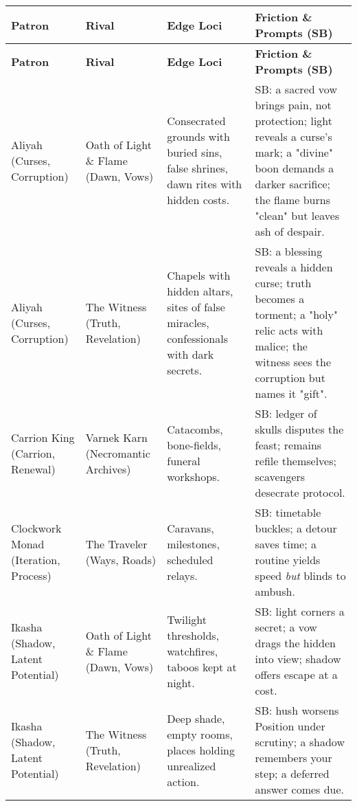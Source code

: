 \begin{longtable}{@{}p{3.3cm}p{3.3cm}p{4.6cm}p{7.2cm}@{}}
  \toprule
  \textbf{Patron} & \textbf{Rival} & \textbf{Edge Loci} & \textbf{Friction \& Prompts (SB)} \\
  \midrule
  \endfirsthead
  
  \toprule
  \textbf{Patron} & \textbf{Rival} & \textbf{Edge Loci} & \textbf{Friction \& Prompts (SB)} \\
  \midrule
  \endhead
  
  \bottomrule
  \endfoot


Aliyah (Curses, Corruption) & Oath of Light \& Flame (Dawn, Vows) &
Consecrated grounds with buried sins, false shrines, dawn rites with hidden costs. &
SB: a sacred vow brings pain, not protection; light reveals a curse's mark; a "divine" boon demands a darker sacrifice; the flame burns "clean" but leaves ash of despair. \\

Aliyah (Curses, Corruption) & The Witness (Truth, Revelation) &
Chapels with hidden altars, sites of false miracles, confessionals with dark secrets. &
SB: a blessing reveals a hidden curse; truth becomes a torment; a "holy" relic acts with malice; the witness sees the corruption but names it "gift". \\

Carrion King (Carrion, Renewal) & Varnek Karn (Necromantic Archives) &
Catacombs, bone-fields, funeral workshops. &
SB: ledger of skulls disputes the feast; remains refile themselves; scavengers desecrate protocol. \\

Clockwork Monad (Iteration, Process) & The Traveler (Ways, Roads) &
Caravans, milestones, scheduled relays. &
SB: timetable buckles; a detour saves time; a routine yields speed \emph{but} blinds to ambush. \\

Ikasha (Shadow, Latent Potential) & Oath of Light \& Flame (Dawn, Vows) &
Twilight thresholds, watchfires, taboos kept at night. &
SB: light corners a secret; a vow drags the hidden into view; shadow offers escape at a cost. \\

Ikasha (Shadow, Latent Potential) & The Witness (Truth, Revelation) &
Deep shade, empty rooms, places holding unrealized action. &
SB: hush worsens Position under scrutiny; a shadow remembers your step; a deferred answer comes due. \\


\end{longtable}
